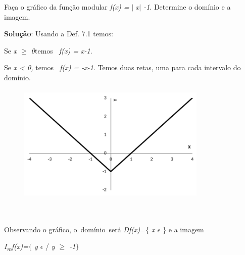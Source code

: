 \begin{texemplo}

Faça o gráfico da função modular \textit{f(x) =} $ \vert $ \textit{x$ \vert $ -1}. Determine o domínio e a imagem.  

\textbf{Solução}: Usando a Def. 7.1 temos:

\quad Se \textit{x $ \geq $  0}temos\textit{~ f(x) = x-1}.

\quad Se \textit{x < 0, }temos\textit{~ f(x) = -x-1}. Temos duas retas, uma para cada intervalo do domínio.

\begin{figure}[H]
	\begin{Center}
		\includegraphics[width=3.55in,height=2.24in]{capitulos/outras_funcoes/media/image32.pdf}
	\end{Center}
\end{figure}

~~

\quad Observando o gráfico, o~domínio~será   \textit{Df(x)=$ \{ $ x $ \epsilon $  \textbf{ }$ \} $ } e a imagem

\quad \textit{I\textsubscript{m}f(x)=$ \{ $ y $ \epsilon $  }/ \textit{y $ \geq $  -1$ \} $ } \qedsymbol{}
\end{texemplo}

